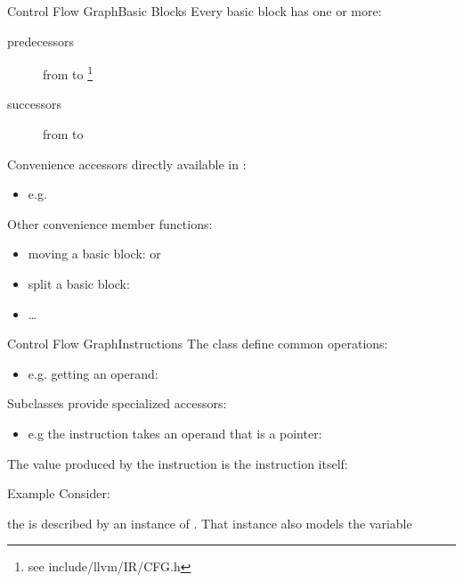 \documentclass[10pt,mathserif]{beamer}
\begin{document}
\begin{frame}{Control Flow Graph}{Basic Blocks}
Every basic block  has one or more:

\begin{description}
\item[predecessors] from  to
       \footnote{see include/llvm/IR/CFG.h}
\item[successors] from  to
\end{description}

\vfill
Convenience accessors directly available in :

\begin{itemize}
\item e.g. 
\end{itemize}

Other convenience member functions:

\begin{itemize}
\item moving a basic block:
       or
\item split a basic block:
\item \ldots
\end{itemize}
\end{frame}

\begin{frame}{Control Flow Graph}{Instructions}
The  class define common operations:

\begin{itemize}
\item e.g. getting an operand: 
\end{itemize}

Subclasses provide specialized accessors:

\begin{itemize}
\item e.g the  instruction takes an operand that is a pointer:
\end{itemize}

\pause
\vfill
The value produced by the instruction is the \alert{instruction itself}:

\begin{block}{Example}
Consider:

\centering
{}

\flushleft
the  is described
by an instance of . That instance also models the
 variable
\end{block}
\end{frame}
\end{document}
